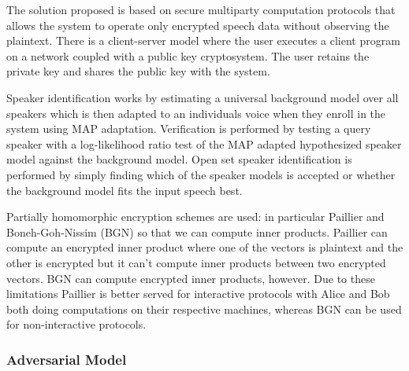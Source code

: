 The solution proposed is based on secure multiparty computation protocols that allows the system
to operate only encrypted speech data without observing the plaintext.  There is a client-server
model where the user executes a client program on a network coupled with a public key cryptosystem.
The user retains the private key and shares the public key with the system.


Speaker identification works by estimating a universal background model over all speakers which is then adapted to an individuals voice when they enroll in the system using MAP adaptation.  Verification
is performed by testing a query speaker with a log-likelihood
ratio test of the MAP adapted hypothesized speaker model
against the background model.  Open set speaker identification
is performed by simply finding which of the speaker models
is accepted or whether the background model fits the input
speech best.

Partially homomorphic encryption schemes are used: in particular
Paillier and Boneh-Goh-Nissim (BGN) so that we can compute inner
products.  Paillier can compute an encrypted inner product where
one of the vectors is plaintext and the other is encrypted
but it can't compute inner products between two encrypted vectors.
BGN can compute encrypted inner products, however.  Due to these
limitations Paillier is better served for interactive protocols
with Alice and Bob both doing computations on their respective
machines, whereas BGN can be used for non-interactive protocols.

\subsubsection{Adversarial Model}



